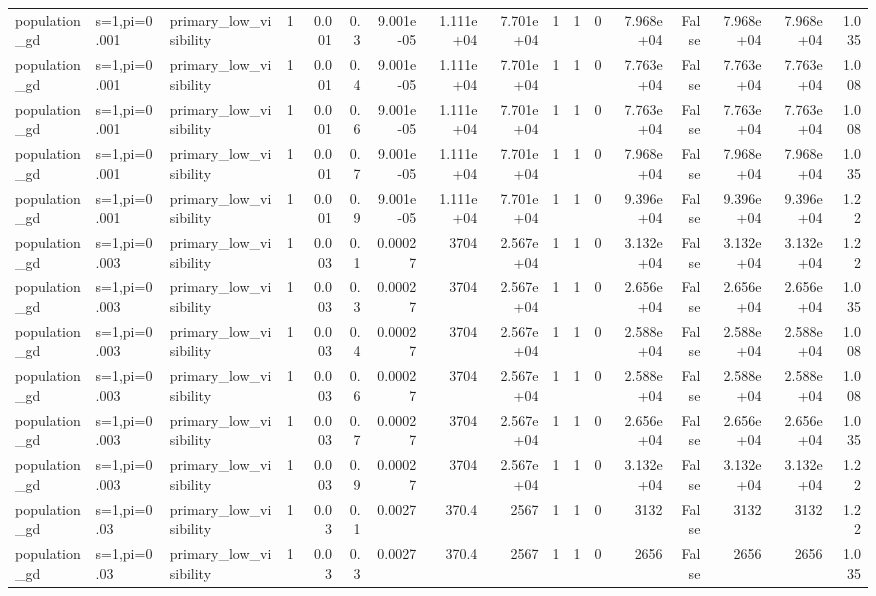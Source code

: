 \begin{tabular}{lllrrrrrrrrrrrrrr}
population_gd & s=1,pi=0.001 & primary_low_visibility & 1 & 0.001 & 0.3 & 9.001e-05 & 1.111e+04 & 7.701e+04 & 1 & 1 & 0 & 7.968e+04 & False & 7.968e+04 & 7.968e+04 & 1.035 \\
population_gd & s=1,pi=0.001 & primary_low_visibility & 1 & 0.001 & 0.4 & 9.001e-05 & 1.111e+04 & 7.701e+04 & 1 & 1 & 0 & 7.763e+04 & False & 7.763e+04 & 7.763e+04 & 1.008 \\
population_gd & s=1,pi=0.001 & primary_low_visibility & 1 & 0.001 & 0.6 & 9.001e-05 & 1.111e+04 & 7.701e+04 & 1 & 1 & 0 & 7.763e+04 & False & 7.763e+04 & 7.763e+04 & 1.008 \\
population_gd & s=1,pi=0.001 & primary_low_visibility & 1 & 0.001 & 0.7 & 9.001e-05 & 1.111e+04 & 7.701e+04 & 1 & 1 & 0 & 7.968e+04 & False & 7.968e+04 & 7.968e+04 & 1.035 \\
population_gd & s=1,pi=0.001 & primary_low_visibility & 1 & 0.001 & 0.9 & 9.001e-05 & 1.111e+04 & 7.701e+04 & 1 & 1 & 0 & 9.396e+04 & False & 9.396e+04 & 9.396e+04 & 1.22 \\
population_gd & s=1,pi=0.003 & primary_low_visibility & 1 & 0.003 & 0.1 & 0.00027 & 3704 & 2.567e+04 & 1 & 1 & 0 & 3.132e+04 & False & 3.132e+04 & 3.132e+04 & 1.22 \\
population_gd & s=1,pi=0.003 & primary_low_visibility & 1 & 0.003 & 0.3 & 0.00027 & 3704 & 2.567e+04 & 1 & 1 & 0 & 2.656e+04 & False & 2.656e+04 & 2.656e+04 & 1.035 \\
population_gd & s=1,pi=0.003 & primary_low_visibility & 1 & 0.003 & 0.4 & 0.00027 & 3704 & 2.567e+04 & 1 & 1 & 0 & 2.588e+04 & False & 2.588e+04 & 2.588e+04 & 1.008 \\
population_gd & s=1,pi=0.003 & primary_low_visibility & 1 & 0.003 & 0.6 & 0.00027 & 3704 & 2.567e+04 & 1 & 1 & 0 & 2.588e+04 & False & 2.588e+04 & 2.588e+04 & 1.008 \\
population_gd & s=1,pi=0.003 & primary_low_visibility & 1 & 0.003 & 0.7 & 0.00027 & 3704 & 2.567e+04 & 1 & 1 & 0 & 2.656e+04 & False & 2.656e+04 & 2.656e+04 & 1.035 \\
population_gd & s=1,pi=0.003 & primary_low_visibility & 1 & 0.003 & 0.9 & 0.00027 & 3704 & 2.567e+04 & 1 & 1 & 0 & 3.132e+04 & False & 3.132e+04 & 3.132e+04 & 1.22 \\
population_gd & s=1,pi=0.03 & primary_low_visibility & 1 & 0.03 & 0.1 & 0.0027 & 370.4 & 2567 & 1 & 1 & 0 & 3132 & False & 3132 & 3132 & 1.22 \\
population_gd & s=1,pi=0.03 & primary_low_visibility & 1 & 0.03 & 0.3 & 0.0027 & 370.4 & 2567 & 1 & 1 & 0 & 2656 & False & 2656 & 2656 & 1.035 \\

\end{tabular}
